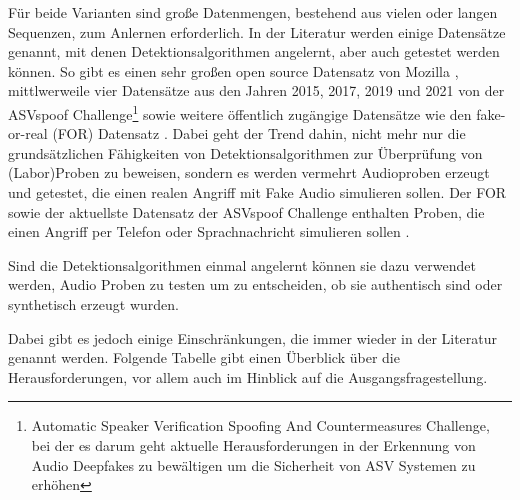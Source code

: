 Für beide Varianten sind große Datenmengen, bestehend aus vielen oder langen Sequenzen, zum Anlernen erforderlich.
In der Literatur werden einige Datensätze genannt, mit denen Detektionsalgorithmen angelernt, aber auch getestet werden können.
So gibt es einen sehr großen open source Datensatz von Mozilla \citep[][]{Ardila2019}, mittlwerweile vier Datensätze aus den Jahren 2015, 2017, 2019 und 2021 von der ASVspoof Challenge\footnote{Automatic Speaker Verification Spoofing And Countermeasures Challenge, bei der es darum geht aktuelle Herausforderungen in der Erkennung von Audio Deepfakes zu bewältigen um die Sicherheit von ASV Systemen zu erhöhen\citep[][]{Yamagishi2021}} sowie weitere öffentlich zugängige Datensätze wie den fake-or-real (FOR) Datensatz \citep[][]{Reimao2019}. 
Dabei geht der Trend dahin, nicht mehr nur die grundsätzlichen Fähigkeiten von Detektionsalgorithmen zur Überprüfung von (Labor)Proben zu beweisen, sondern es werden vermehrt Audioproben erzeugt und getestet, die einen realen Angriff mit Fake Audio simulieren sollen.
Der FOR sowie der aktuellste Datensatz der ASVspoof Challenge enthalten Proben, die einen Angriff per Telefon oder Sprachnachricht simulieren sollen \citep[][]{Masood2022}.

Sind die Detektionsalgorithmen einmal angelernt können sie dazu verwendet werden, Audio Proben zu testen um zu entscheiden, ob sie authentisch sind oder synthetisch erzeugt wurden.

Dabei gibt es jedoch einige Einschränkungen, die immer wieder in der Literatur genannt werden.
Folgende Tabelle gibt einen Überblick über die Herausforderungen, vor allem auch im Hinblick auf die Ausgangsfragestellung.
\clearpage

